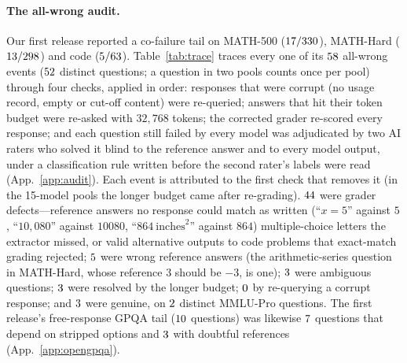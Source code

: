 \documentclass[11pt]{article}
\theoremstyle{plain}
\theoremstyle{definition}
\begin{document}
\paragraph{The all-wrong audit.} Our first release reported a co-failure tail on MATH-500 ($17/330$), MATH-Hard
($13/298$) and code ($5/63$). Table~\ref{tab:trace} traces every one of its $58$ all-wrong events ($52$ distinct questions; a question in two pools counts once
per pool) through four checks, applied in
order: responses that were corrupt (no usage record, empty or cut-off content) were re-queried; answers that hit their token
budget were re-asked with $32{,}768$ tokens; the corrected grader re-scored every response; and each question still failed by
every model was adjudicated by two AI raters who solved it blind to the reference answer and to every model output, under a
classification rule written before the second rater's labels were read (App.~\ref{app:audit}). Each event is attributed to
the first check that removes it (in the 15-model pools the longer budget came after re-grading). $44$ were grader
defects---reference answers no response could match as written (``$x{=}5$'' against $5$, ``$10{,}\!080$'' against $10080$,
``$864\ \mathrm{inches}^2$'' against $864$) multiple-choice letters the extractor missed, or valid alternative outputs to code problems that exact-match
grading rejected; $5$ were wrong reference
answers (the arithmetic-series question in MATH-Hard, whose reference $3$ should be $-3$, is one); $3$ were ambiguous
questions; $3$ were resolved by the longer budget; $0$ by
re-querying a corrupt response; and $3$ were genuine, on $2$ distinct MMLU-Pro questions. The first release's free-response GPQA tail ($10$
questions) was likewise $7$ questions that depend on stripped options and $3$ with doubtful references
(App.~\ref{app:opengpqa}).
\end{document}
